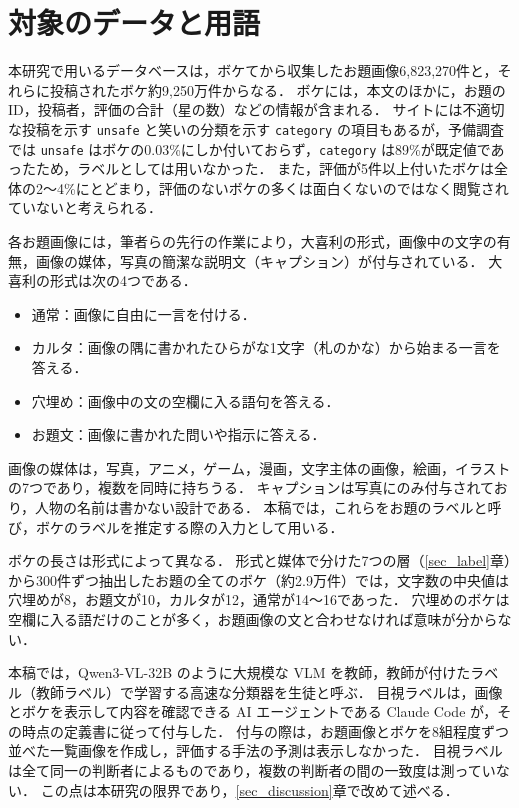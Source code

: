 \section{対象のデータと用語}
\label{sec_data}
本研究で用いるデータベースは，ボケてから収集したお題画像6,823,270件と，それらに投稿されたボケ約9,250万件からなる．
ボケには，本文のほかに，お題の ID，投稿者，評価の合計（星の数）などの情報が含まれる．
サイトには不適切な投稿を示す \texttt{unsafe} と笑いの分類を示す \texttt{category} の項目もあるが，予備調査では \texttt{unsafe} はボケの0.03\%にしか付いておらず，\texttt{category} は89\%が既定値であったため，ラベルとしては用いなかった．
また，評価が5件以上付いたボケは全体の2〜4\%にとどまり，評価のないボケの多くは面白くないのではなく閲覧されていないと考えられる．

各お題画像には，筆者らの先行の作業により，大喜利の形式，画像中の文字の有無，画像の媒体，写真の簡潔な説明文（キャプション）が付与されている．
大喜利の形式は次の4つである．
\begin{itemize}
    \item 通常：画像に自由に一言を付ける．
    \item カルタ：画像の隅に書かれたひらがな1文字（札のかな）から始まる一言を答える．
    \item 穴埋め：画像中の文の空欄に入る語句を答える．
    \item お題文：画像に書かれた問いや指示に答える．
\end{itemize}
画像の媒体は，写真，アニメ，ゲーム，漫画，文字主体の画像，絵画，イラストの7つであり，複数を同時に持ちうる．
キャプションは写真にのみ付与されており，人物の名前は書かない設計である．
本稿では，これらをお題のラベルと呼び，ボケのラベルを推定する際の入力として用いる．

ボケの長さは形式によって異なる．
形式と媒体で分けた7つの層（\ref{sec_label}章）から300件ずつ抽出したお題の全てのボケ（約2.9万件）では，文字数の中央値は穴埋めが8，お題文が10，カルタが12，通常が14〜16であった．
穴埋めのボケは空欄に入る語だけのことが多く，お題画像の文と合わせなければ意味が分からない．

本稿では，Qwen3-VL-32B のように大規模な VLM を教師，教師が付けたラベル（教師ラベル）で学習する高速な分類器を生徒と呼ぶ．
目視ラベルは，画像とボケを表示して内容を確認できる AI エージェントである Claude Code が，その時点の定義書に従って付与した．
付与の際は，お題画像とボケを8組程度ずつ並べた一覧画像を作成し，評価する手法の予測は表示しなかった．
目視ラベルは全て同一の判断者によるものであり，複数の判断者の間の一致度は測っていない．
この点は本研究の限界であり，\ref{sec_discussion}章で改めて述べる．
